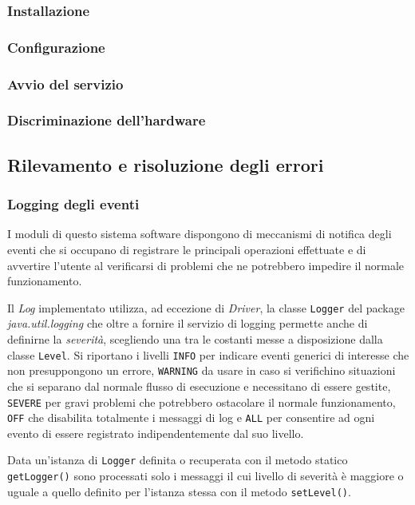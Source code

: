 \subsubsection{Installazione}
\subsubsection{Configurazione}
\subsubsection{Avvio del servizio}
\subsubsection{Discriminazione dell'hardware}

\newpage
\subsection{Rilevamento e risoluzione degli errori}
\subsubsection{Logging degli eventi}
I moduli di questo sistema software dispongono di meccanismi di notifica degli
eventi che si occupano di registrare le principali operazioni effettuate e di
avvertire l'utente al verificarsi di problemi che ne potrebbero impedire il
normale funzionamento.

Il \textit{Log} implementato utilizza, ad eccezione di \textit{Driver}, la
classe \texttt{Logger} del package \textit{java.util.logging} \cite{jianlog} che
oltre a fornire il servizio di logging permette anche di definirne la
\textit{severità}, scegliendo una tra le costanti messe a disposizione dalla
classe \texttt{Level}. Si riportano  i livelli \texttt{INFO}
per indicare eventi generici di interesse che non presuppongono un errore,
\texttt{WARNING} da usare in caso si verifichino situazioni che si separano dal
normale flusso di esecuzione e necessitano di essere gestite, \texttt{SEVERE}
per gravi problemi che potrebbero ostacolare il normale funzionamento,
\texttt{OFF} che disabilita totalmente i messaggi di log e \texttt{ALL} per
consentire ad ogni evento di essere registrato indipendentemente dal suo livello.

Data un'istanza di \texttt{Logger} definita o recuperata con il metodo statico
\texttt{getLogger()} sono processati solo i messaggi il cui livello di
severità è maggiore o uguale a quello definito per l'istanza stessa con il
metodo \texttt{setLevel()}.

